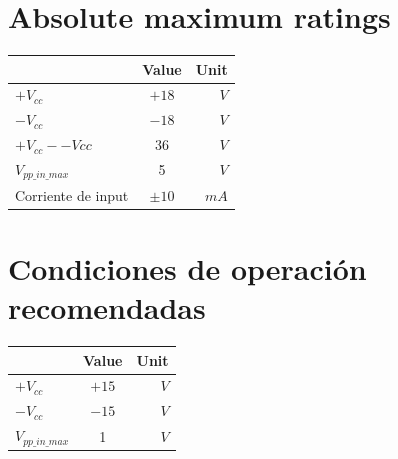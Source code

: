 \documentclass[a4paper,12pt,oneside,pdflatex,italian,final,twocolumn]{article}
\begin{document}
\begin{minipage}{0.47\textwidth}
  \section{Absolute maximum ratings}
  \centering
  \begin{tabular}{lcr}
    \toprule
    & Value & Unit \\
    \midrule
    $+V_{cc}$ & $+18$ & $V$ \\
    $-V_{cc}$ & $-18$ & $V$  \\
    $+V_{cc} - -V{cc}$ & $36$ & $V$ \\
    $V_{pp\_in\_max}$ & 5 & $V$ \\
    Corriente de input & $\pm 10$ & $mA$ \\
    \bottomrule
  \end{tabular}
\end{minipage}
\hfill
\begin{minipage}{0.47\textwidth}
  \section{Condiciones de operación recomendadas}
  \centering
  \begin{tabular}{lcr}
    \toprule
    & Value & Unit \\
    \midrule
    $+V_{cc}$ & $+15$ & $V$ \\
    $-V_{cc}$ & $-15$ & $V$  \\
    $V_{pp\_in\_max}$ & 1 & $V$ \\
    \bottomrule
  \end{tabular}
\end{minipage}

\raggedright

\newpage
\end{document}
